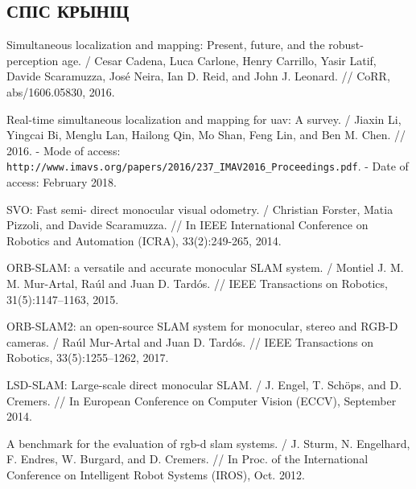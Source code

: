\begin{center}
    \section*{СПІС КРЫНІЦ}
\end{center}

\begingroup
\renewcommand{\chapter}[2]{}%
\begin{thebibliography}{30}

    Simultaneous localization and mapping: Present, future, and the robust-perception age. /
    Cesar Cadena, Luca Carlone, Henry Carrillo, Yasir Latif, Davide Scaramuzza,
    Jos{\'{e}} Neira, Ian D. Reid, and John J. Leonard. //
    CoRR, abs/1606.05830, 2016.

    Real-time simultaneous localization and mapping for uav: A survey. /
    Jiaxin Li, Yingcai Bi, Menglu Lan, Hailong Qin, Mo Shan, Feng Lin, and Ben M. Chen. //
    2016. - Mode of access: \verb|http://www.imavs.org/papers/2016/237_IMAV2016_Proceedings.pdf|.
    - Date of access: February 2018.

    SVO: Fast semi- direct monocular visual odometry. /
    Christian Forster, Matia Pizzoli, and Davide Scaramuzza. //
    In IEEE International Conference on Robotics and Automation (ICRA), 33(2):249-265, 2014.

    ORB-SLAM: a versatile and accurate monocular SLAM system. /
    Montiel J. M. M. Mur-Artal, Ra\'ul and Juan D. Tard\'os. //
    IEEE Transactions on Robotics, 31(5):1147–1163, 2015.

    ORB-SLAM2: an open-source SLAM system for monocular, stereo and RGB-D cameras. /
    Ra\'ul Mur-Artal and Juan D. Tard\'os. //
    IEEE Transactions on Robotics, 33(5):1255–1262, 2017.

    LSD-SLAM: Large-scale direct monocular SLAM. /
    J. Engel, T. Sch\"ops, and D. Cremers. //
    In European Conference on Computer Vision (ECCV), September 2014.

    A benchmark for the evaluation of rgb-d slam systems. /
    J. Sturm, N. Engelhard, F. Endres, W. Burgard, and D. Cremers. //
    In Proc. of the International Conference on Intelligent Robot Systems (IROS), Oct. 2012.


\end{thebibliography}

